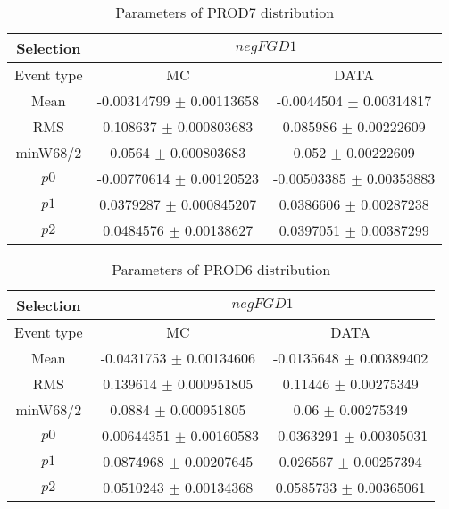 \documentclass[a4paper,12pt]{article}
\begin{document}
\begin{table}[htbp]
\begin{center}
\begin{tabular}{|c|c|c|}
        \hline
        Selection & \multicolumn{2}{|c|}{$negFGD1$}  \\ \hline
        Event type & MC & DATA \\ 
        \hline
        Mean & -0.00314799 $\pm$ 0.00113658 & -0.0044504 $\pm$ 0.00314817 \\ 
        \hline 
        RMS & 0.108637 $\pm$ 0.000803683 & 0.085986 $\pm$ 0.00222609 \\ 
        \hline 
        minW68/2 & 0.0564 $\pm$ 0.000803683 & 0.052 $\pm$ 0.00222609 \\ 
        \hline 
        $p0$ & -0.00770614 $\pm$ 0.00120523 & -0.00503385 $\pm$ 0.00353883 \\ 
        \hline 
        $p1$ & 0.0379287 $\pm$ 0.000845207 & 0.0386606 $\pm$ 0.00287238 \\ 
        \hline 
        $p2$ & 0.0484576 $\pm$ 0.00138627 & 0.0397051 $\pm$ 0.00387299 \\ 
        \hline 
\end{tabular}
\caption{Parameters of PROD7 distribution } \vspace{0.2in}
\label{xxx}
\end{center}
\end{table}
\begin{table}[htbp]
\begin{center}
\begin{tabular}{|c|c|c|}
        \hline
        Selection & \multicolumn{2}{|c|}{$negFGD1$}  \\ \hline
        Event type & MC & DATA \\ 
        \hline
        Mean & -0.0431753 $\pm$ 0.00134606 & -0.0135648 $\pm$ 0.00389402 \\ 
        \hline 
        RMS & 0.139614 $\pm$ 0.000951805 & 0.11446 $\pm$ 0.00275349 \\ 
        \hline 
        minW68/2 & 0.0884 $\pm$ 0.000951805 & 0.06 $\pm$ 0.00275349 \\ 
        \hline 
        $p0$ & -0.00644351 $\pm$ 0.00160583 & -0.0363291 $\pm$ 0.00305031 \\ 
        \hline 
        $p1$ & 0.0874968 $\pm$ 0.00207645 & 0.026567 $\pm$ 0.00257394 \\ 
        \hline 
        $p2$ & 0.0510243 $\pm$ 0.00134368 & 0.0585733 $\pm$ 0.00365061 \\ 
        \hline 
\end{tabular}
\caption{Parameters of PROD6 distribution } \vspace{0.2in}
\label{xxx}
\end{center}
\end{table}
\end{document}
